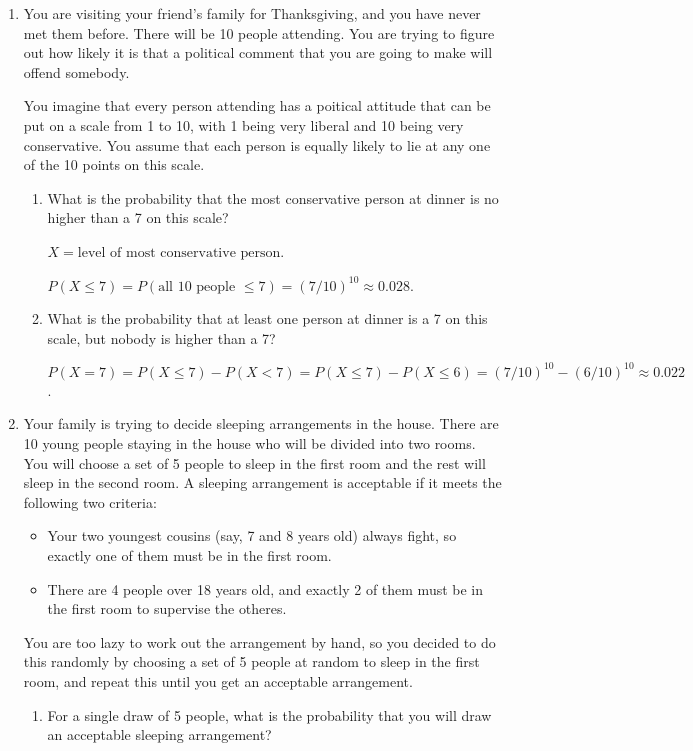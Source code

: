 \documentclass[11pt]{article}
\begin{document}
\begin{enumerate}
\begin{enumerate}
\end{enumerate}

\item You are visiting your friend's family for Thanksgiving, and you have never met them before. There will be 10 people attending. You are trying to figure out how likely it is that a political comment that you are going to make will offend somebody.

You imagine that every person attending has a poitical attitude that can be put on a scale from 1 to 10, with 1 being very liberal and 10 being very conservative. You assume that each person is equally likely to lie at any one of the 10 points on this scale.
\begin{enumerate}
\item What is the probability that the most conservative person at dinner is no higher than a 7 on this scale?

    {\color{red} $X = \textrm{level of most conservative person}$.

    $P(X \leq 7) = P(\textrm{all 10 people }\leq 7) = (7/10)^{10} \approx 0.028$.}

\item What is the probability that at least one person at dinner is a 7 on this scale, but nobody is higher than a 7?
    
    {\color{red} $P(X = 7) = P(X \leq 7) - P(X < 7) = P(X \leq 7) - P(X \leq 6) = (7/10)^{10} - (6/10)^{10} \approx 0.022$.}
\end{enumerate}

\item Your family is trying to decide sleeping arrangements in the house. There are 10 young people staying in the house who will be divided into two rooms. You will choose a set of 5 people to sleep in the first room and the rest will sleep in the second room. A sleeping arrangement is acceptable if it meets the following two criteria:
\begin{itemize}
\item Your two youngest cousins (say, 7 and 8 years old) always fight, so exactly one of them must be in the first room. 
\item There are 4 people over 18 years old, and exactly 2 of them must be in the first room to supervise the otheres.
\end{itemize}
You are too lazy to work out the arrangement by hand, so you decided to do this randomly by choosing a set of 5 people at random to sleep in the first room, and repeat this until you get an acceptable arrangement.
\begin{enumerate}
\item For a single draw of 5 people, what is the probability that you will draw an acceptable sleeping arrangement?


\end{enumerate}
\end{enumerate}
\end{document}
